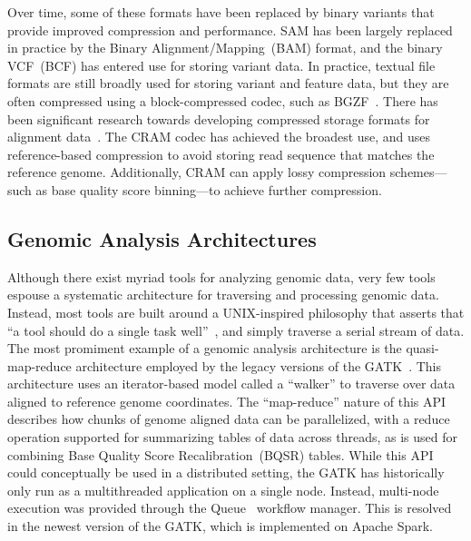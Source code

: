 \documentclass[phd]{ucbthesis}
\begin{document}
Over time, some of these formats have been replaced by binary variants that
provide improved compression and performance. SAM has been largely replaced
in practice by the {Binary Alignment/Mapping}~(BAM) format, and the
binary VCF~(BCF) has entered use for storing variant data. In practice,
textual file formats are still broadly used for storing variant and feature
data, but they are often compressed using a block-compressed codec, such as
BGZF~\cite{li11tabix}. There has been significant research towards developing
compressed storage formats for alignment data~\cite{kozanitis11, fritz11}.
The CRAM codec has achieved the broadest use, and uses reference-based
compression to avoid storing read sequence that matches the reference genome.
Additionally, CRAM can apply lossy compression schemes---such as base quality
score binning---to achieve further compression.

\subsection{Genomic Analysis Architectures}
\label{sec:genomic-architectures}

Although there exist myriad tools for analyzing genomic data, very few tools
espouse a systematic architecture for traversing and processing genomic data.
Instead, most tools are built around a UNIX-inspired philosophy that asserts
that ``a tool should do a single task well''~\cite{rodriguez11}, and simply
traverse a serial stream of data. The most promiment example of a genomic analysis
architecture is the quasi-map-reduce architecture employed by the legacy
versions of the GATK~\cite{mckenna10}. This architecture uses an iterator-based
model called a ``walker'' to traverse over data aligned to reference genome
coordinates. The ``map-reduce'' nature of this API describes how chunks of
genome aligned data can be parallelized, with a reduce operation supported
for summarizing tables of data across threads, as is used for combining
Base Quality Score Recalibration~(BQSR) tables. While this API could
conceptually be used in a distributed setting, the GATK has historically
only run as a multithreaded application on a single node. Instead,
multi-node execution was provided through the {Queue}~\cite{depristo11}
workflow manager. This is resolved in the newest version of the GATK, which is
implemented on Apache Spark.
\end{document}
